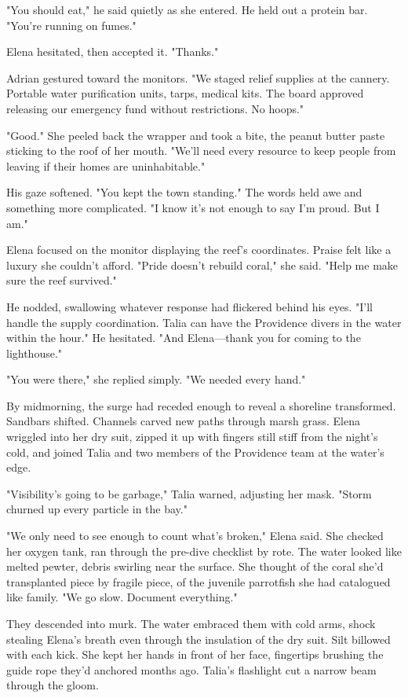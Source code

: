 "You should eat," he said quietly as she entered. He held out a protein bar. "You're running on fumes."

Elena hesitated, then accepted it. "Thanks."

Adrian gestured toward the monitors. "We staged relief supplies at the cannery. Portable water purification units, tarps, medical kits. The board approved releasing our emergency fund without restrictions. No hoops."

"Good." She peeled back the wrapper and took a bite, the peanut butter paste sticking to the roof of her mouth. "We'll need every resource to keep people from leaving if their homes are uninhabitable."

His gaze softened. "You kept the town standing." The words held awe and something more complicated. "I know it's not enough to say I'm proud. But I am."

Elena focused on the monitor displaying the reef's coordinates. Praise felt like a luxury she couldn't afford. "Pride doesn't rebuild coral," she said. "Help me make sure the reef survived."

He nodded, swallowing whatever response had flickered behind his eyes. "I'll handle the supply coordination. Talia can have the Providence divers in the water within the hour." He hesitated. "And Elena—thank you for coming to the lighthouse."

"You were there," she replied simply. "We needed every hand."

By midmorning, the surge had receded enough to reveal a shoreline transformed. Sandbars shifted. Channels carved new paths through marsh grass. Elena wriggled into her dry suit, zipped it up with fingers still stiff from the night's cold, and joined Talia and two members of the Providence team at the water's edge.

"Visibility's going to be garbage," Talia warned, adjusting her mask. "Storm churned up every particle in the bay."

"We only need to see enough to count what's broken," Elena said. She checked her oxygen tank, ran through the pre-dive checklist by rote. The water looked like melted pewter, debris swirling near the surface. She thought of the coral she'd transplanted piece by fragile piece, of the juvenile parrotfish she had catalogued like family. "We go slow. Document everything."

They descended into murk. The water embraced them with cold arms, shock stealing Elena's breath even through the insulation of the dry suit. Silt billowed with each kick. She kept her hands in front of her face, fingertips brushing the guide rope they'd anchored months ago. Talia's flashlight cut a narrow beam through the gloom.

